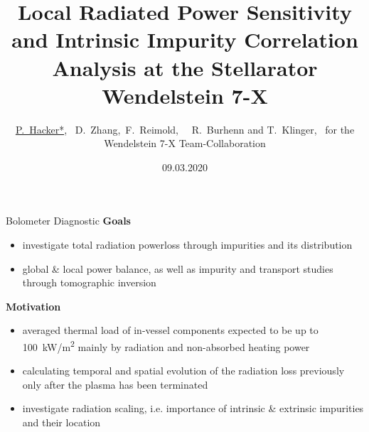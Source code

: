 \documentclass[final]{beamer}
\title{%
    Local Radiated Power Sensitivity and Intrinsic Impurity Correlation %
    Analysis at the Stellarator Wendelstein 7-X}%
\author[Author]%
    {\underline{P.~Hacker\inst{1,2}*},%
     ~D.~Zhang\inst{1},~F.~Reimold\inst{1},~%
     ~R.~Burhenn\inst{1} %
     and T.~Klinger\inst{1},~%
     for the Wendelstein 7-X Team-Collaboration\inst{1}}
\institute[]{%
    \inst{1}%
        Max~Planck~Institute~for~Plasma~Physics,~Wendelsteinstr.~1,~%
        D-17491~Greifswald,~Germany,\\%
    \inst{2}%
        Ernst-Moritz-Arndt~University~Greifswald,~%
        Rubenowstr.~1,~D-17489~Greifswald,~Germany}
\date{09.03.2020}
\newcommand{\fett}[1]{\textbf{#1}}
\begin{document}
\begin{frame}\frametitle{}%
    \begin{minipage}[t]{0.39\textwidth}%
        \vfill%
        \begin{kasten}{\large%
            Bolometer Diagnostic}%
            \vspace*{.25cm}%
            \large{{\color{ipp}\fett{%
                Goals}}}%
            \vspace*{.25cm}%
            \small{\begin{itemize}%
                \item{%
                    investigate total radiation powerloss through %
                    impurities and its distribution}%
                \item{%
                   global \& local power balance, as well as impurity %
                   and transport studies through tomographic %
                   inversion}%
            \end{itemize}}%
            \vspace*{.25cm}%
            \large{{\color{ipp}\fett{%
                Motivation}}}%
            \vspace*{.25cm}%
            \small{\begin{itemize}%
                \item{%
                    averaged thermal load of in-vessel components %
                    expected to be up to %
                    \mbox{\SI{100}{\kilo\watt/\square\meter}} mainly by %
                    radiation and non-absorbed heating power}%
                \item{%
                    calculating temporal and spatial evolution of %
                    the radiation loss previously only after the plasma %
                    has been terminated}
                \item{%
                    investigate radiation scaling, i.e. %
                    importance of intrinsic \& extrinsic impurities %
                    and their location}%
            \end{itemize}}

\end{kasten}
\end{minipage}
\end{frame}
\end{document}
